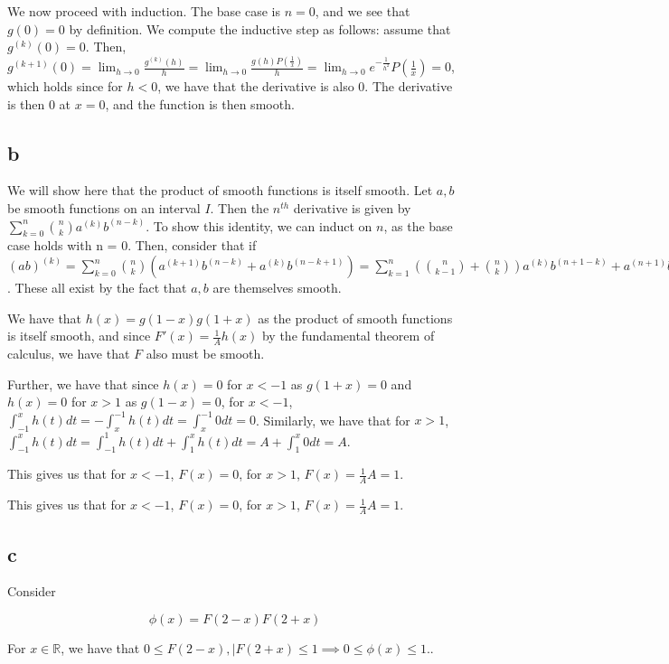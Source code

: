 \documentclass[12pt,letterpaper]{article}
\theoremstyle{definition}
\newcommand{\R}{\mathbb{R}}
\begin{document}
We now proceed with induction. The base case is $n = 0$, and we see that $g(0) =
0$ by definition. We compute the inductive step as follows: assume that
$g^{(k)}(0) = 0$. Then, $g^{(k+1)}(0) = \lim_{h\rightarrow
  0}\frac{g^{(k)}(h)}{h} = \lim_{h\rightarrow 0} \frac{g(h)P(\frac{1}{x})}{h} =
\lim_{h\rightarrow 0} e^{-\frac{1}{h^2}}P(\frac{1}{x}) = 0$, which holds since
for $h < 0$, we have that the derivative is also 0. The derivative is
then 0 at $x = 0$, and the function is then smooth.

\subsection*{b}

We will show here that the product of smooth functions is itself smooth. Let
$a,b$ be smooth functions on an interval $I$. Then the $n^{th}$ derivative is
given by $\sum_{k=0}^n{n\choose k}a^{(k)}b^{(n-k)}$. To show this identity, we
can induct on $n$, as the base case holds with n = 0. Then, consider that if
$(ab)^{(k)} = \sum_{k=0}^n{n\choose k}(a^{(k+1)}b^{(n-k)}+a^{(k)}b^{(n-k+1)}) =
\sum_{k=1}^{n}({n \choose k-1} + {n \choose k})a^{(k)}b^{(n+1-k)} + a^{(n+1)}b +
ab^{(n+1)} = \sum_{k=0}^{n+1}{n+1\choose k }a^{(k)}b^{n+1-k}$. These all exist by the
fact that $a,b$ are themselves smooth.

We have that $h(x) = g(1-x)g(1+x)$ as the product of smooth functions is itself
smooth, and since $F'(x) = \frac{1}{A}h(x)$ by the fundamental theorem of
calculus, we have that $F$ also must be smooth.

Further, we have that since $h(x) = 0$ for $x < -1$ as $g(1+x) = 0$ and $h(x) =
0$ for $x > 1$ as $g(1-x) = 0$, for $x < -1$, $\int_{-1}^xh(t)dt =
-\int_{x}^{-1}h(t)dt = \int_{x}^{-1}0dt = 0$. Similarly, we have that for $x >
1$, $\int_{-1}^xh(t)dt = \int_{-1}^1h(t)dt + \int_1^xh(t)dt = A + \int_1^x0dt = A$.

This gives us that for $x < -1$, $F(x) = 0$, for $x > 1$, $F(x) = \frac{1}{A}A =
1$.

This gives us that for $x < -1$, $F(x) = 0$, for $x > 1$, $F(x) = \frac{1}{A}A =
1$.

\subsection*{c}

Consider

\[
  \phi(x) = F(2-x)F(2+x)
\]

For $x \in \R$, we have that $0 \leq F(2-x), |F(2+x) \leq 1 \implies 0 \leq \phi(x)
\leq 1$..
\end{document}
